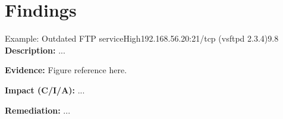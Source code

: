 \section{Findings}
\begin{finding}{Example: Outdated FTP service}{High}{192.168.56.20:21/tcp (vsftpd 2.3.4)}{9.8}
\textbf{Description:} ...\par
\textbf{Evidence:} Figure reference here.\par
\textbf{Impact (C/I/A):} ...\par
\textbf{Remediation:} ...
\end{finding}
